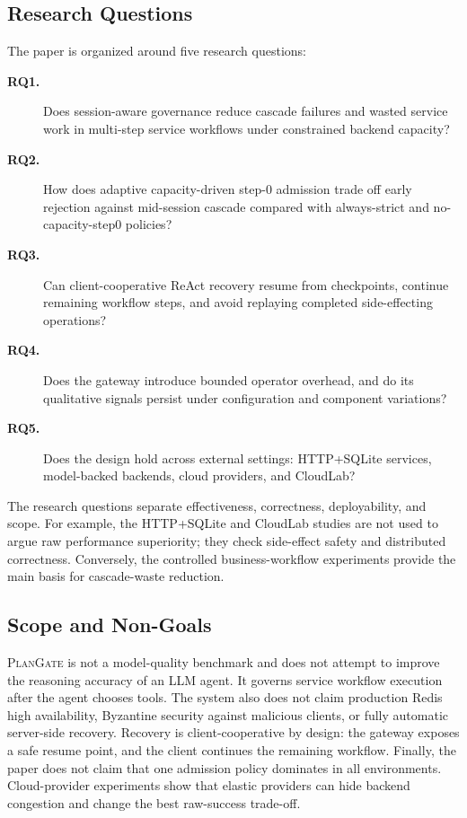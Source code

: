\documentclass[5p,times]{elsarticle}
\newcommand{\plangate}{\textsc{PlanGate}\xspace}
\begin{document}
\subsection{Research Questions}

The paper is organized around five research questions:

\begin{description}
  \item[\textbf{RQ1.}] Does session-aware governance reduce cascade failures and wasted service work in multi-step service workflows under constrained backend capacity?
  \item[\textbf{RQ2.}] How does adaptive capacity-driven step-0 admission trade off early rejection against mid-session cascade compared with always-strict and no-capacity-step0 policies?
  \item[\textbf{RQ3.}] Can client-cooperative ReAct recovery resume from checkpoints, continue remaining workflow steps, and avoid replaying completed side-effecting operations?
  \item[\textbf{RQ4.}] Does the gateway introduce bounded operator overhead, and do its qualitative signals persist under configuration and component variations?
  \item[\textbf{RQ5.}] Does the design hold across external settings: HTTP+SQLite services, model-backed backends, cloud providers, and CloudLab?
\end{description}

The research questions separate effectiveness, correctness, deployability, and scope. For example, the HTTP+SQLite and CloudLab studies are not used to argue raw performance superiority; they check side-effect safety and distributed correctness. Conversely, the controlled business-workflow experiments provide the main basis for cascade-waste reduction.

\subsection{Scope and Non-Goals}

\plangate is not a model-quality benchmark and does not attempt to improve the reasoning accuracy of an LLM agent. It governs service workflow execution after the agent chooses tools. The system also does not claim production Redis high availability, Byzantine security against malicious clients, or fully automatic server-side recovery. Recovery is client-cooperative by design: the gateway exposes a safe resume point, and the client continues the remaining workflow. Finally, the paper does not claim that one admission policy dominates in all environments. Cloud-provider experiments show that elastic providers can hide backend congestion and change the best raw-success trade-off.
\end{document}
